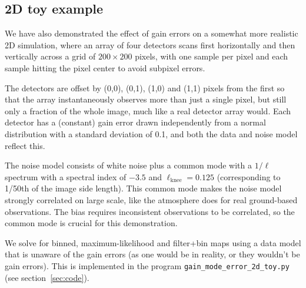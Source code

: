 \documentclass{aa}
\begin{document}
\subsection{2D toy example}
We have also demonstrated the effect of gain errors on a somewhat more realistic
2D simulation, where an array of four detectors scans first horizontally and then vertically
across a grid of $200\times200$ pixels, with one sample per pixel and each sample
hitting the pixel center to avoid subpixel errors.

The detectors are offset by
(0,0), (0,1), (1,0) and (1,1) pixels from the first so that the array instantaneously
observes more than just a single pixel, but still only a fraction of the whole image, much like
a real detector array would. Each detector has a (constant) gain error drawn
independently from a normal distribution with a standard deviation of 0.1, and both the
data and noise model reflect this.

The noise model consists of white noise plus a
common mode with a $1/\ell$ spectrum with a spectral index of $-3.5$ and $\ell_\text{knee} = 0.125$
(corresponding to 1/50th of the image side length). This common mode makes the noise model
strongly correlated on large scale, like the atmosphere does for real ground-based observations.
The bias requires inconsistent observations to be correlated, so the common mode is crucial for
this demonstration.

We solve for binned, maximum-likelihood and filter+bin
maps using a data model that is unaware of the gain errors (as one would be in reality,
or they wouldn't be gain errors). This is implemented in the program \verb|gain_mode_error_2d_toy.py|
(see section~\ref{sec:code}).
\end{document}

